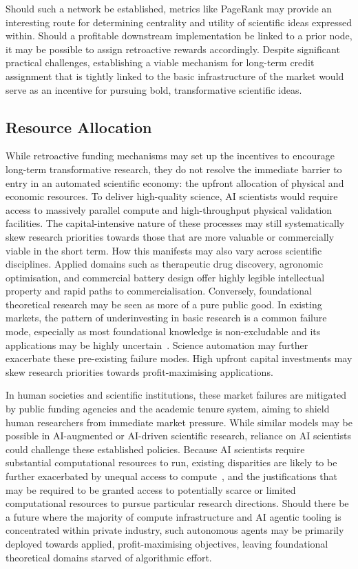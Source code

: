 \documentclass[11pt, a4paper, twocolumn, goog]{google}
\begin{document}
Should such a network be established, metrics like PageRank may provide an interesting route for determining centrality and utility of scientific ideas expressed within. Should a profitable downstream implementation be linked to a prior node, it may be possible to assign retroactive rewards accordingly. Despite significant practical challenges, establishing a viable mechanism for long-term credit assignment that is tightly linked to the basic infrastructure of the market would serve as an incentive for pursuing bold, transformative scientific ideas.

\subsection{Resource Allocation}

While retroactive funding mechanisms may set up the incentives to encourage long-term transformative research, they do not resolve the immediate barrier to entry in an automated scientific economy: the upfront allocation of physical and economic resources. To deliver high-quality science, AI scientists would require access to massively parallel compute and high-throughput physical validation facilities. The capital-intensive nature of these processes may still systematically skew research priorities towards those that are more valuable or commercially viable in the short term. How this manifests may also vary across scientific disciplines. Applied domains such as therapeutic drug discovery, agronomic optimisation, and commercial battery design offer highly legible intellectual property and rapid paths to commercialisation. Conversely, foundational theoretical research may be seen as more of a pure public good. In existing markets, the pattern of underinvesting in basic research is a common failure mode, especially as most foundational knowledge is non-excludable and its applications may be highly uncertain~\citep{nelson1959simple, arrow1962economic, stephan2015economics}. Science automation may further exacerbate these pre-existing failure modes. High upfront capital investments may skew research priorities towards profit-maximising applications.

In human societies and scientific institutions, these market failures are mitigated by public funding agencies and the academic tenure system, aiming to shield human researchers from immediate market pressure. While similar models may be possible in AI-augmented or AI-driven scientific research, reliance on AI scientists could challenge these established policies. Because AI scientists require substantial computational resources to run, existing disparities are likely to be further exacerbated by unequal access to compute~\citep{ahmed2020democratization, widder2023open}, and the justifications that may be required to be granted access to potentially scarce or limited computational resources to pursue particular research directions. Should there be a future where the majority of compute infrastructure and AI agentic tooling is concentrated within private industry, such autonomous agents may be primarily deployed towards applied, profit-maximising objectives, leaving foundational theoretical domains starved of algorithmic effort.
\end{document}

